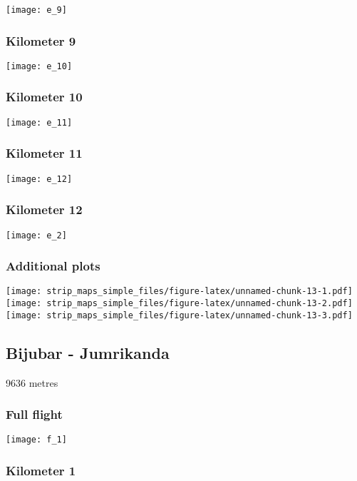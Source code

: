 \documentclass[]{article}
\begin{document}
\texttt{[image: e\_9]}

\subsubsection{Kilometer 9}\label{kilometer-9-3}

\texttt{[image: e\_10]}

\subsubsection{Kilometer 10}\label{kilometer-10-3}

\texttt{[image: e\_11]}

\subsubsection{Kilometer 11}\label{kilometer-11-1}

\texttt{[image: e\_12]}

\subsubsection{Kilometer 12}\label{kilometer-12-1}

\texttt{[image: e\_2]}

\subsubsection{Additional plots}\label{additional-plots-4}

\texttt{[image: strip\_maps\_simple\_files/figure-latex/unnamed-chunk-13-1.pdf]}
\texttt{[image: strip\_maps\_simple\_files/figure-latex/unnamed-chunk-13-2.pdf]}
\texttt{[image: strip\_maps\_simple\_files/figure-latex/unnamed-chunk-13-3.pdf]}

\newpage

\subsection{Bijubar - Jumrikanda}\label{bijubar---jumrikanda}

9636 metres

\subsubsection{Full flight}\label{full-flight-5}

\texttt{[image: f\_1]}

\subsubsection{Kilometer 1}\label{kilometer-1-5}
\end{document}
